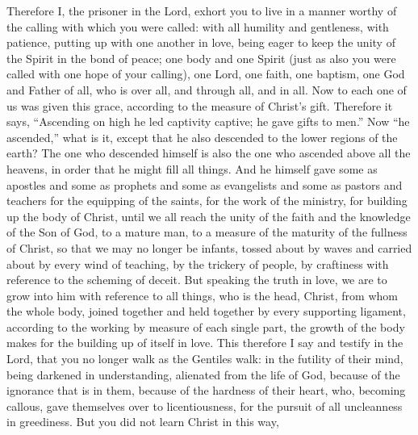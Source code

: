 \begin{biblechapter} %
 Therefore I, the prisoner in the Lord, exhort you to live in a manner worthy of the calling with which you were called:
\verse with all humility and gentleness, with patience, putting up with one another in love,
\verse being eager to keep the unity of the Spirit in the bond of peace;
\verse one body and one Spirit (just as also you were called with one hope of your calling),
\verse one Lord, one faith, one baptism,
\verse one God and Father of all, who is over all, and through all, and in all.
 Now to each one of us was given this grace, according to the measure of Christ’s gift.
\verse Therefore it says, “Ascending on high he led captivity captive; 
he gave gifts to men.”
\verse Now “he ascended,” what is it, except that he also descended to the lower regions of the earth?
\verse The one who descended himself is also the one who ascended above all the heavens, in order that he might fill all things.
\verse And he himself gave some as apostles and some as prophets and some as evangelists and some as pastors and teachers
\verse for the equipping of the saints, for the work of the ministry, for building up the body of Christ,
\verse until we all reach the unity of the faith and the knowledge of the Son of God, to a mature man, to a measure of the maturity of the fullness of Christ,
\verse so that we may no longer be infants, tossed about by waves and carried about by every wind of teaching, by the trickery of people, by craftiness with reference to the scheming of deceit.
\verse But speaking the truth in love, we are to grow into him with reference to all things, who is the head, Christ,
\verse from whom the whole body, joined together and held together by every supporting ligament, according to the working by measure of each single part, the growth of the body makes for the building up of itself in love.
 This therefore I say and testify in the Lord, that you no longer walk as the Gentiles walk: in the futility of their mind,
\verse being darkened in understanding, alienated from the life of God, because of the ignorance that is in them, because of the hardness of their heart,
\verse who, becoming callous, gave themselves over to licentiousness, for the pursuit of all uncleanness in greediness.
\verse But you did not learn Christ in this way,

\end{biblechapter}
